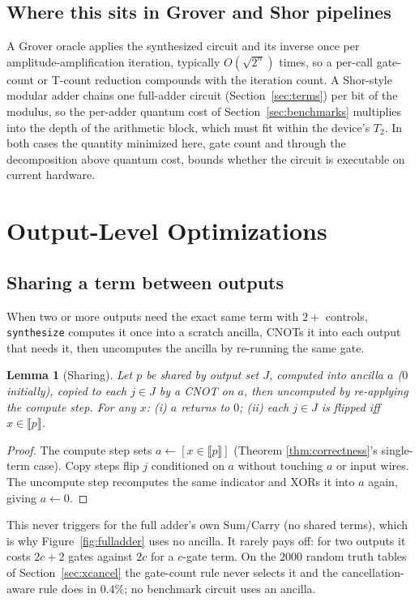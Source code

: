 \documentclass[conference]{IEEEtran}
\newcommand{\code}[1]{\texttt{#1}}
\theoremstyle{plain}
\newtheorem{lemma}{Lemma}
\begin{document}
\subsection{Where this sits in Grover and Shor pipelines}
A Grover oracle applies the synthesized circuit and its inverse once per
amplitude-amplification iteration, typically $O(\sqrt{2^n})$ times, so a
per-call gate-count or T-count reduction compounds with the iteration
count. A Shor-style modular adder chains one full-adder circuit
(Section~\ref{sec:terms}) per bit of the modulus, so the per-adder
quantum cost of Section~\ref{sec:benchmarks} multiplies into the depth of
the arithmetic block, which must fit within the device's $T_2$. In both
cases the quantity minimized here, gate count and through the
decomposition above quantum cost, bounds whether the circuit is
executable on current hardware.

\section{Output-Level Optimizations}
\label{sec:optim}

\subsection{Sharing a term between outputs}
When two or more outputs need the exact same term with $2{+}$ controls,
\code{synthesize} computes it once into a scratch ancilla, CNOTs it into
each output that needs it, then uncomputes the ancilla by re-running the
same gate.

\begin{lemma}[Sharing]
\label{lem:sharing}
Let $p$ be shared by output set $J$, computed into ancilla $a$ ($0$
initially), copied to each $j\in J$ by a CNOT on $a$, then uncomputed by
re-applying the compute step. For any $x$: (i) $a$ returns to $0$; (ii)
each $j\in J$ is flipped iff $x\in\llbracket p\rrbracket$.
\end{lemma}
\begin{proof}
The compute step sets $a\gets[x\in\llbracket p\rrbracket]$ (Theorem
\ref{thm:correctness}'s single-term case). Copy steps flip $j$
conditioned on $a$ without touching $a$ or input wires. The uncompute
step recomputes the same indicator and XORs it into $a$ again, giving
$a\gets 0$.
\end{proof}
This never triggers for the full adder's own $\mathrm{Sum}$/$\mathrm{Carry}$
(no shared terms), which is why Figure~\ref{fig:fulladder} uses no
ancilla. It rarely pays off: for two outputs it costs $2c+2$ gates
against $2c$ for a $c$-gate term. On the $2000$ random truth tables of
Section~\ref{sec:xcancel} the gate-count rule never selects it and the
cancellation-aware rule does in $0.4\%$; no benchmark circuit uses an
ancilla.
\end{document}
